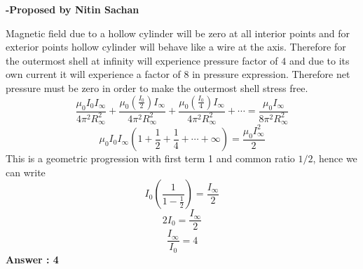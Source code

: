 \documentclass[11pt,a4paper]{scrartcl}
\begin{document}
\begin{problem}
\begin{center}

\end{center}


\end{problem}
\begin{flushright}
\textbf{\Large{-Proposed by Nitin Sachan}}
\end{flushright}
\begin{solution}
Magnetic field due to a hollow cylinder will be zero at all interior points and for exterior points hollow cylinder will behave like a wire at the axis. Therefore for the outermost shell at infinity will experience pressure factor of $4$ and due to its own current it will experience a factor of $8$ in pressure expression. Therefore net pressure must be zero in order to make the outermost shell stress free.
$$\frac{\mu_{0} I_{0} I_{\infty}}{4\pi^2 R_{\infty}^2}+\frac{\mu_{0} \left(\frac{I_{0}}{2}\right) I_{\infty}}{4\pi^2 R_{\infty}^2}+\frac{\mu_{0} \left(\frac{I_{0}}{4}\right) I_{\infty}}{4\pi^2 R_{\infty}^2}+\cdots= \frac{\mu_{0} I_{\infty}}{8\pi^2 R_{\infty}^2}$$
$$\mu_{0} I_{0} I_{\infty} \left(1+\frac{1}{2}+\frac{1}{4}+\cdots+\infty\right)=\frac{\mu_{0} I_{\infty}^2}{2}$$
This is a geometric progression with first term 1 and common ratio $1/2$, hence we can write
$$I_{0} \left(\frac{1}{1-\frac{1}{2}}\right)=\frac{I_\infty}{2}$$
$$2I_0 = \frac{I_\infty}{2}$$
$$\boxed{\frac{I_\infty}{I_0}=4}$$
\textbf{Answer : 4}
\end{solution}
\vspace{1cm}%
\end{document}
